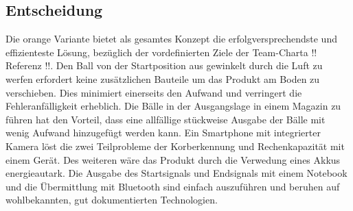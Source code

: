 \subsection{Entscheidung}
Die orange Variante bietet als gesamtes Konzept die erfolgversprechendste und effizienteste Lösung, bezüglich der vordefinierten Ziele der Team-Charta !! Referenz !!. Den Ball von der Startposition aus gewinkelt durch die Luft zu werfen erfordert keine zusätzlichen Bauteile um das Produkt am Boden zu verschieben. Dies minimiert einerseits den Aufwand und verringert die Fehleranfälligkeit erheblich. Die Bälle in der Ausgangslage in einem Magazin zu führen hat den Vorteil, dass eine allfällige stückweise Ausgabe der Bälle mit wenig Aufwand hinzugefügt werden kann. Ein Smartphone mit integrierter Kamera löst die zwei Teilprobleme der Korberkennung und Rechenkapazität mit einem Gerät. Des weiteren wäre das Produkt durch die Verwedung eines Akkus energieautark. Die Ausgabe des Startsignals und Endsignals mit einem Notebook und die Übermittlung mit Bluetooth sind einfach auszuführen und beruhen auf wohlbekannten, gut dokumentierten Technologien.